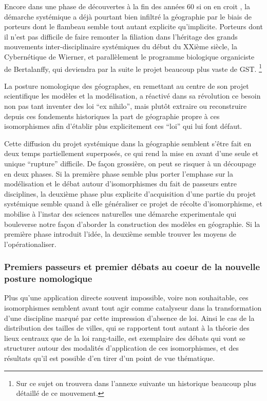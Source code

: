 Encore dans une phase de découvertes à la fin des années 60 si on en croit \textcite{Harvey1969}, la démarche systémique a déjà pourtant bien infiltré la géographie par le biais de porteurs dont le flambeau semble tout autant explicite qu'implicite. Porteurs dont il n'est pas difficile de faire remonter la filiation dans l'héritage des grands mouvements inter-disciplinaire systémiques du début du XXième siècle, la Cybernétique de Wierner, et parallèlement le programme biologique organiciste de Bertalanffy, qui deviendra par la suite le projet beaucoup plus vaste de GST. \footnote{Sur ce sujet on trouvera dans l'annexe suivante un historique beaucoup plus détaillé de ce mouvement.}

La posture nomologique des géographes, en remettant au centre de son projet scientifique les modèles et la modélisation, a réactivé dans sa révolution ce besoin non pas tant inventer des loi \foreignquote{latin}{ex nihilo}, mais plutôt extraire ou reconstruire depuis ces fondements historiques la part de géographie propre à ces isomorphismes afin d'établir plus explicitement ces \enquote{loi} qui lui font défaut.

Cette diffusion du projet systémique dans la géographie semblent s'être fait en deux temps partiellement superposés, ce qui rend la mise en avant d'une seule et unique \enquote{rupture} difficile. De façon grossière, on peut se risquer à un découpage en deux phases. Si la première phase semble plus porter l'emphase sur la modélisation et le débat autour d'isomorphismes du fait de passeurs entre disciplines, la deuxième phase plus explicite d'acquisition d'une partie du projet systémique semble quand à elle généraliser ce projet de récolte d'isomorphisme, et mobilise à l'instar des sciences naturelles une démarche experimentale qui bouleverse notre façon d'aborder la construction des modèles en géographie. Si la première phase introduit l'idée, la deuxième semble trouver les moyens de l'opérationaliser.

\subsubsection{Premiers passeurs et premier débats au coeur de la nouvelle posture nomologique}

Plus qu'une application directe souvent impossible, voire non souhaitable, ces isomorphismes semblent avant tout agir comme catalyseur dans la transformation d'une discipline marqué par cette impression d'absence de loi. Ainsi le cas de la distribution des tailles de villes, qui se rapportent tout autant à la théorie des lieux centraux que de la loi rang-taille, est exemplaire des débats qui vont se structurer autour des modalités d'application de ces isomorphismes, et des résultats qu'il est possible d'en tirer d'un point de vue thématique. 


